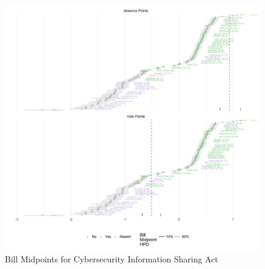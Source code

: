 \begin{figure}
	\caption{Bill Midpoints for Cybersecurity Information Sharing Act}\label{cyber}
	\centering
	\includegraphics[width=\linewidth]{con_discrim_bill}
\end{figure}

